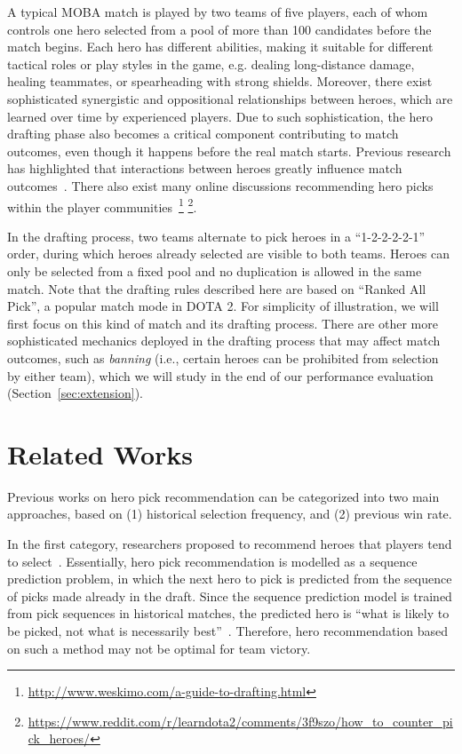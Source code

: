 A typical MOBA match is played by two teams of five players, each of whom controls one hero selected from a pool of more than 100 candidates before the match begins. Each hero has different abilities, making it suitable for different tactical roles or play styles in the game, e.g. dealing long-distance damage, healing teammates, or spearheading with strong shields. Moreover, there exist sophisticated synergistic and oppositional relationships between heroes, which are learned over time by experienced players. Due to such sophistication, the hero drafting phase also becomes a critical component contributing to match outcomes, even though it happens before the real match starts. Previous research has highlighted that interactions between heroes greatly influence match outcomes~\cite{pobie1,Semenov2016,kim2016proficiency}. There also exist many online discussions recommending hero picks within the player communities~\footnote{\url{http://www.weskimo.com/a-guide-to-drafting.html}} \footnote{\url{https://www.reddit.com/r/learndota2/comments/3f9szo/how_to_counter_pick_heroes/}}.

In the drafting process, two teams alternate to pick heroes in a ``1-2-2-2-2-1'' order, during which heroes already selected are visible to both teams. Heroes can only be selected from a fixed pool and no duplication is allowed in the same match. Note that the drafting rules described here are based on ``Ranked All Pick'', a popular match mode in DOTA 2. For simplicity of illustration, we will first focus on this kind of match and its drafting process. There are other more sophisticated mechanics deployed in the drafting process that may affect match outcomes, such as \textit{banning} (i.e., certain heroes can be prohibited from selection by either team), which we will study in the end of our performance evaluation (Section~\ref{sec:extension}).

\section{Related Works}

Previous works on hero pick recommendation can be categorized into two main approaches, based on (1) historical selection frequency, and (2) previous win rate.

In the first category, researchers proposed to recommend heroes that players tend to select~\cite{summerville2017reco}. Essentially, hero pick recommendation is modelled as a sequence prediction problem, in which the next hero to pick is predicted from the sequence of picks made already in the draft. Since the sequence prediction model is trained from pick sequences in historical matches, the predicted hero is ``what is
likely to be picked, not what is necessarily best''~\cite{summerville2017reco}. Therefore, hero recommendation based on such a method may not be optimal for team victory.

